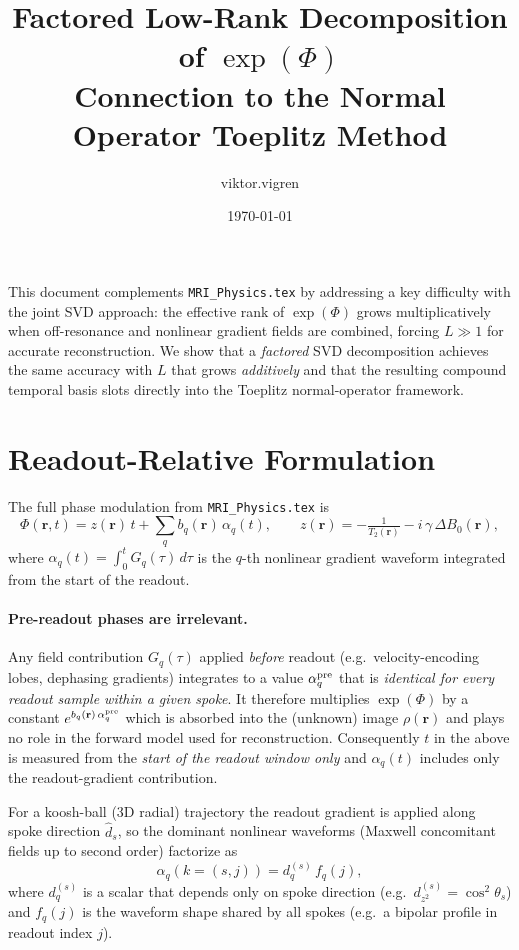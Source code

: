 \documentclass{article}
\title{Factored Low-Rank Decomposition of $\exp(\Phi)$\\
\large Connection to the Normal Operator Toeplitz Method}
\author{viktor.vigren}
\date{\today}
\begin{document}
\maketitle

This document complements \texttt{MRI\_Physics.tex} by addressing a key difficulty with the
joint SVD approach: the effective rank of $\exp(\Phi)$ grows multiplicatively when off-resonance
and nonlinear gradient fields are combined, forcing $L \gg 1$ for accurate reconstruction.
We show that a \emph{factored} SVD decomposition achieves the same accuracy with $L$ that grows
\emph{additively} and that the resulting compound temporal basis slots directly into the Toeplitz
normal-operator framework.

\section{Readout-Relative Formulation}

The full phase modulation from \texttt{MRI\_Physics.tex} is
\begin{equation}
    \Phi(\mathbf{r}, t) = z(\mathbf{r})\,t +
        \sum_q b_q(\mathbf{r})\,\alpha_q(t),
    \qquad
    z(\mathbf{r}) = -\tfrac{1}{T_2(\mathbf{r})} - i\,\gamma\,\Delta B_0(\mathbf{r}),
\end{equation}
where $\alpha_q(t) = \int_0^t G_q(\tau)\,d\tau$ is the $q$-th nonlinear gradient
waveform integrated from the start of the readout.

\paragraph{Pre-readout phases are irrelevant.}
Any field contribution $G_q(\tau)$ applied \emph{before} readout (e.g.\ velocity-encoding
lobes, dephasing gradients) integrates to a value $\alpha_q^{\rm pre}$ that is
\emph{identical for every readout sample within a given spoke}.  It therefore
multiplies $\exp(\Phi)$ by a constant $e^{b_q(\mathbf{r})\,\alpha_q^{\rm pre}}$
which is absorbed into the (unknown) image $\rho(\mathbf{r})$ and plays no role in
the forward model used for reconstruction.
Consequently $t$ in the above is measured from the \emph{start of the readout
window only} and $\alpha_q(t)$ includes only the readout-gradient contribution.

For a koosh-ball (3D radial) trajectory the readout gradient is applied along spoke
direction $\hat{d}_s$, so the dominant nonlinear waveforms (Maxwell concomitant
fields up to second order) factorize as
\begin{equation}
    \alpha_q(k{=}(s,j)) = d_q^{(s)}\, f_q(j),
    \label{eq:alpha_factor}
\end{equation}
where $d_q^{(s)}$ is a scalar that depends only on spoke direction (e.g.\
$d_{z^2}^{(s)} = \cos^2\theta_s$) and $f_q(j)$ is the waveform shape shared by
all spokes (e.g.\ a bipolar profile in readout index $j$).
\end{document}
